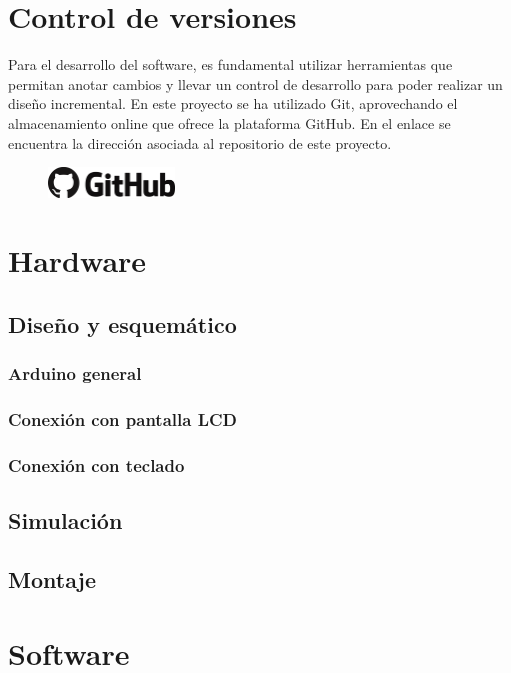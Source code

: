 \section{Control de versiones}
Para el desarrollo del software, es fundamental utilizar herramientas que permitan anotar cambios y llevar un control de desarrollo para poder realizar un diseño incremental. En este proyecto se ha utilizado Git, aprovechando el almacenamiento online que ofrece la plataforma GitHub. En el enlace \cite{GitProyecto} se encuentra la dirección asociada al repositorio de este proyecto.
\\

\begin{figure}[h]
  \centering
  \includegraphics[width=0.3\textwidth]{imagenes/github.png}\\[1cm]
\end{figure}

\section{Hardware}
\subsection{Diseño y esquemático}
\subsubsection{Arduino general}
\subsubsection{Conexión con pantalla LCD}
\subsubsection{Conexión con teclado}
\subsection{Simulación}
\subsection{Montaje}

\section{Software}
